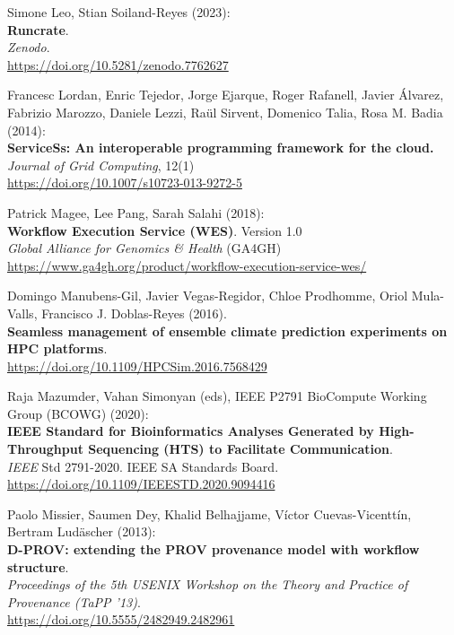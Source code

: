 \documentclass[10pt,letterpaper]{article}
\begin{document}
\begin{thebibliography}{10}
\begin{small}
Simone Leo, Stian Soiland-Reyes (2023):\\
\textbf{Runcrate}.\\
\emph{Zenodo}.\\
\url{https://doi.org/10.5281/zenodo.7762627}

 Francesc Lordan, Enric Tejedor, Jorge Ejarque, Roger
Rafanell, Javier Álvarez, Fabrizio Marozzo, Daniele Lezzi, Raül Sirvent,
Domenico Talia, Rosa M. Badia (2014):\\
\textbf{ServiceSs: An interoperable programming framework for the
cloud.}\\
\emph{Journal of Grid Computing}, 12(1)\\
\url{https://doi.org/10.1007/s10723-013-9272-5}

Patrick Magee, Lee Pang, Sarah Salahi (2018):\\
\textbf{Workflow Execution Service (WES)}. Version 1.0\\
\emph{Global Alliance for Genomics \& Health} (GA4GH)\\
\url{https://www.ga4gh.org/product/workflow-execution-service-wes/}

Domingo Manubens-Gil, Javier Vegas-Regidor, Chloe Prodhomme, Oriol Mula-Valls, Francisco J. Doblas-Reyes (2016).\\
\textbf{Seamless management of ensemble climate prediction experiments on HPC platforms}.\\
\url{https://doi.org/10.1109/HPCSim.2016.7568429}

Raja Mazumder, Vahan Simonyan (eds), IEEE P2791 BioCompute Working Group (BCOWG) (2020):\\
\textbf{IEEE Standard for Bioinformatics Analyses Generated by High-Throughput Sequencing (HTS) to Facilitate Communication}.\\
\emph{IEEE} Std 2791-2020. IEEE SA Standards Board.\\
\url{https://doi.org/10.1109/IEEESTD.2020.9094416}

Paolo Missier, Saumen Dey, Khalid Belhajjame, Víctor Cuevas-Vicenttín, Bertram Ludäscher (2013):\\
\textbf{D-PROV: extending the PROV provenance model with workflow structure}.\\
\emph{Proceedings of the 5th USENIX Workshop on the Theory and Practice of Provenance (TaPP '13)}. \\
\url{https://doi.org/10.5555/2482949.2482961}


\end{small}
\end{thebibliography}
\end{document}

